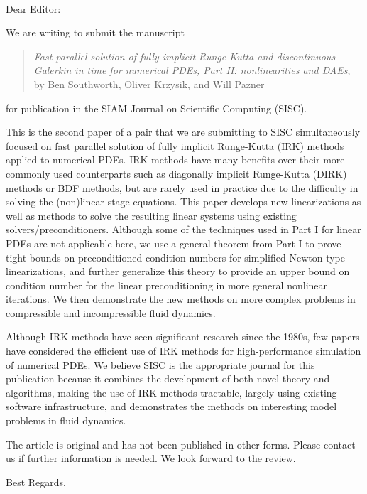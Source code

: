 \documentclass[12pt]{letter}
\date{}
\makeatletter
\renewcommand{\closing}[1]{\par\nobreak\vspace{\parskip}%
  \stopbreaks
  \noindent
  \ifx\@empty\fromaddress\else
  \hspace*{\longindentation}\fi
  \parbox{\indentedwidth}{\raggedright
       \ignorespaces #1\\[2\medskipamount]%
       \ifx\@empty\fromsig
           \fromname
       \else \fromsig \fi\strut}%
   \par}
\makeatother
\begin{document}
\begin{letter}
\\
\opening{Dear Editor:}
\vspace{3ex}

We are writing to submit the manuscript
\begin{quote}
\emph{Fast parallel solution of fully implicit Runge-Kutta and discontinuous
  Galerkin in time for numerical PDEs, Part II: nonlinearities and DAEs},\\
by Ben Southworth, Oliver Krzysik, and Will Pazner
\end{quote}
for publication in the SIAM Journal on Scientific Computing (SISC).

This is the second paper of a pair that we are submitting to SISC simultaneously
focused on fast parallel solution of fully implicit Runge-Kutta (IRK) methods applied
to numerical PDEs. IRK methods have many benefits over
their more commonly used counterparts such as diagonally implicit Runge-Kutta (DIRK)
methods or BDF methods, but are rarely used in practice due to the difficulty
in solving the (non)linear stage equations. This paper develops new linearizations
as well as methods to solve the resulting linear systems using existing
solvers/preconditioners. Although some of the techniques used in Part I for
linear PDEs are not applicable here, we use a general theorem from Part I to
prove tight bounds on preconditioned condition numbers for simplified-Newton-type
linearizations, and further generalize this theory to provide an upper bound on
condition number for the linear preconditioning in more general nonlinear iterations.
We then demonstrate the new methods on more complex problems in compressible and
incompressible fluid dynamics.

Although IRK methods have seen significant research since the 1980s, few
papers have considered the efficient use of IRK methods for high-performance
simulation of numerical PDEs. We believe SISC is the appropriate journal for
this publication because it combines the development of both novel theory and
algorithms, making the use of IRK methods tractable, largely using existing
software infrastructure, and demonstrates the methods on interesting model
problems in fluid dynamics.

The article is original and has not been published in other forms. Please
contact us if further information is needed. We look forward to the
review.\\

\closing{Best Regards,}


\end{letter}
\end{document}
